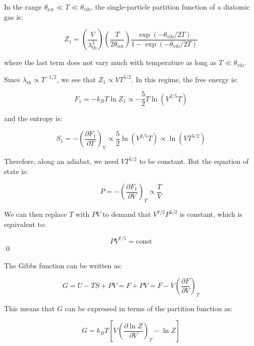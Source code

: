 \documentclass[12pt]{article}
\begin{document}
In the range $\theta_{\text{rot}} \ll T \ll \theta_{\text{vib}}$, the single-particle partition function of a diatomic gas is:

\begin{equation}
    Z_{1} = \left( \frac{V}{\lambda_{\text{th}}^{3}} \right) \left( \frac{T}{2  \theta_{\text{rot}}} \right) \frac{\exp\left( -\theta_{\text{vib}}/2T \right)}{1 - \exp\left( -\theta_{\text{vib}}/2T \right)}
\end{equation}

where the last term does not vary much with temperature as long as $T \ll \theta_{\text{vib}}$.

Since $\lambda_{\text{th}} \propto T^{-1/2}$, we see that $Z_{1} \propto VT^{5/2}$. In this regime, the free energy is:

\begin{equation}
    F_{1} = -k_{B}T \ln{Z_{1}} \propto -\frac{5}{2} T \ln{(V^{2/5}T)}
\end{equation}

and the entropy is:

\begin{equation}
    S_{1} = -\left( \frac{\partial F_{1}}{\partial T} \right)_{V} \propto \frac{5}{2} \ln{(V^{2/5}T)} \propto \ln{(VT^{5/2})}
\end{equation}

Therefore, along an adiabat, we need $VT^{5/2}$ to be constant. But the equation of state is:

\begin{equation}
    P = -\left( \frac{\partial F_{1}}{\partial V} \right)_{T} \propto \frac{T}{V}
\end{equation}

We can then replace $T$ with $PV$ to demand that $V^{7/2} P^{5/2}$ is constant, which is equivalent to:

\begin{equation}
    PV^{7/5} = \text{const}
\end{equation}
\qed


The Gibbs function can be written as:

\begin{equation}
    G = U - TS + PV = F + PV = F - V \left( \frac{\partial F}{\partial V} \right)_{T}
\end{equation}

This means that $G$ can be expressed in terms of the partition function as:

\begin{equation}
    G = k_{B}T \left[ V \left( \frac{\partial \ln{Z}}{\partial V} \right)_{T} - \ln{Z} \right]
\end{equation}
\end{document}
